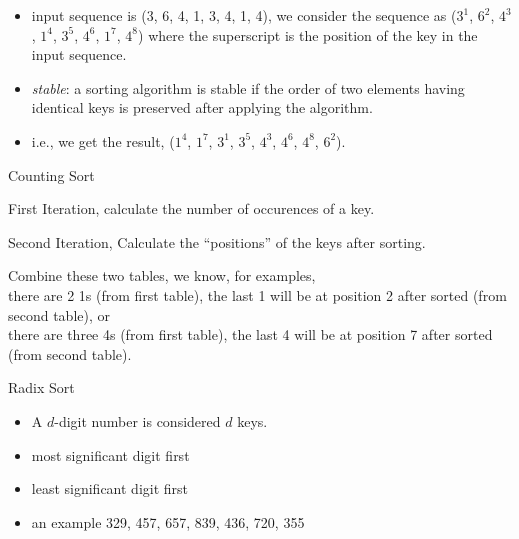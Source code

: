 \documentclass{beamer}
\begin{document}
\begin{frame}{}
\begin{itemize}
\item input sequence is (3, 6, 4, 1, 3, 4, 1, 4), we consider the sequence as ($3^1$,
$6^2$, $4^3$, $1^4$, $3^5$, $4^6$, $1^7$, $4^8$) where the superscript is the position
of the key in the input sequence.
\item {\it stable}: a sorting algorithm is stable if the order of two elements having identical
 keys is preserved after applying the algorithm. 
\item i.e., we get the result, ($1^4$, $1^7$, $3^1$, $3^5$, $4^3$, $4^6$, $4^8$, $6^2$). 
\end{itemize}
\end{frame}

\begin{frame}{}
\centerline{\large Counting Sort}
\centerline{First Iteration, calculate the number of occurences of a key. }
\vskip 40pt
\centerline{Second Iteration, Calculate the ``positions'' of the keys after sorting.}
\end{frame}

\begin{frame}{}
\vskip 40pt
Combine these two tables, we know, for examples, \\
there are 2 1s (from first table), the last 1 will be at position 2 after sorted (from second table), or \\
there are three 4s (from first table), the last 4 will be at position 7 after sorted (from second table). 
\end{frame}

\begin{frame}{}
\begin{center}
Radix Sort
\end{center}
\begin{itemize}
\item A $d$-digit number is considered $d$ keys.
\item most significant digit first
\item least significant digit first
\item an example 329, 457, 657, 839, 436, 720, 355
\end{itemize}
\end{frame}
\end{document}
